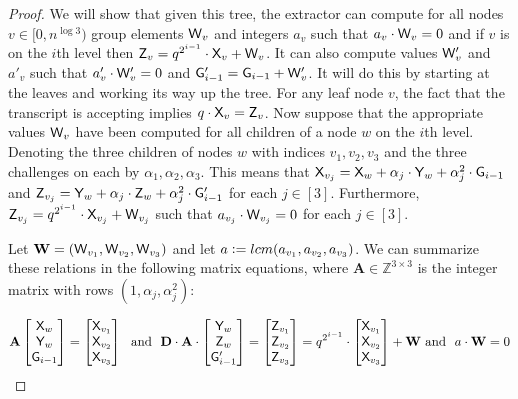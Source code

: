\documentclass[12pt]{article}
\theoremstyle{Definition}
\begin{document}
\begin{proof}
We will show that given this tree, the extractor can compute for all nodes $v \in [0, n^{\log 3})$ group elements $\mathsf{W}_v$ and integers $a_v$ such that $a_v \cdot \mathsf{W}_v = 0$ and if $v$ is on the $i$th level then $\mathsf{Z}_v = q^{2^{i-1}} \cdot \mathsf{X}_v + \mathsf{W}_v$. It can also compute values $\mathsf{W}'_v$ and $a'_v$ such that $a'_v \cdot \mathsf{W}'_v = 0$ and $\mathsf{G}'_{i-1} = \mathsf{G}_{i-1} + \mathsf{W}'_v$. It will do this by starting at the leaves and working its way up the tree.
For any leaf node $v$, the fact that the transcript is accepting implies $q \cdot \mathsf{X}_v = \mathsf{Z}_v$. Now suppose that the appropriate values $\mathsf{W}_v$ have been computed for all children of a node $w$ on the $i$th level. Denoting the three children of nodes $w$ with indices $v_1, v_2, v_3$ and the three challenges on each by $\alpha_1, \alpha_2, \alpha_3$. This means that $\mathsf{X}_{v_j} = \mathsf{X}_w + \alpha_j \cdot \mathsf{Y}_w + \alpha_j^2 \cdot \mathsf{G}_{i-1}$ and $\mathsf{Z}_{v_j} = \mathsf{Y}_w + \alpha_j \cdot \mathsf{Z}_w + \alpha^2_j \cdot \mathsf{G}'_{i-1}$ for each $j \in [3]$.
Furthermore, $\mathsf{Z}_{v_j} = q^{2^{i-1}} \cdot \mathsf{X}_{v_j} + \mathsf{W}_{v_j}$ such that $a_{v_j} \cdot \mathsf{W}_{v_j} = 0$ for each $j \in [3]$. 

Let $\mathbf{W} = (\mathsf{W}_{v_1}, \mathsf{W}_{v_2}, \mathsf{W}_{v_3})$ and let $a \mathrel{\mathop:}= lcm(a_{v_1}, a_{v_2}, a_{v_3})$. We can summarize these relations in the following matrix equations, where $\mathbf{A} \in \mathbb{Z}^{3\times 3}$ is the integer matrix with rows $(1, \alpha_j, \alpha_j^2)$:

$$\mathbf{A}
\begin{bmatrix}
\gr{X}_w \\ 
\gr{Y}_w \\ 
\gr{G}_{i-1}
\end{bmatrix} 
=  
\begin{bmatrix}
\gr{X}_{v_1} \\ 
\gr{X}_{v_2} \\ 
\gr{X}_{v_3}
\end{bmatrix}
\ \ \text{and} \ \ 
\mathbf{D} \cdot 
\mathbf{A} \cdot 
\begin{bmatrix}
\gr{Y}_w \\ 
\gr{Z}_w \\ 
\gr{G}'_{i-1}
\end{bmatrix} 
= 
\begin{bmatrix}
\gr{Z}_{v_1} \\ 
\gr{Z}_{v_2} \\ 
\gr{Z}_{v_3}
\end{bmatrix} 
= 
q^{2^{i-1}} \cdot 
\begin{bmatrix}
\gr{X}_{v_1} \\ 
\gr{X}_{v_2} \\ 
\gr{X}_{v_3}
\end{bmatrix}
+ 
\mathbf{W}  
\ \text{and} \ \ a \cdot \mathbf{W} = 0
$$


\end{proof}
\end{document}

